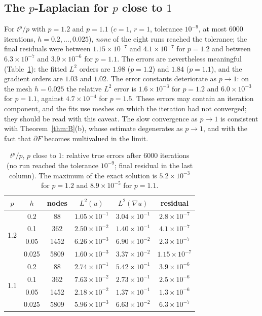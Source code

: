\documentclass[11pt]{amsart}
\theoremstyle{definition}
\theoremstyle{remark}
\numberwithin{equation}{section}
\begin{document}
\subsection{The $p$-Laplacian for $p$ close to $1$}\label{ssec:pto1}
For $t^p/p$ with $p=1.2$ and $p=1.1$ ($c=1$, $r=1$, tolerance $10^{-9}$, at most $6000$ iterations, $h=0.2,\dots,0.025$), \emph{none} of the eight runs reached the tolerance; the final residuals were between $1.15\times10^{-7}$ and $4.1\times10^{-7}$ for $p=1.2$ and between $6.3\times10^{-7}$ and $3.9\times10^{-6}$ for $p=1.1$. The errors are nevertheless meaningful (Table~\ref{tab:pto1}): the fitted $L^2$ orders are $1.98$ ($p=1.2$) and $1.84$ ($p=1.1$), and the gradient orders are $1.03$ and $1.02$. The error constants deteriorate as $p\to1$: on the mesh $h=0.025$ the relative $L^2$ error is $1.6\times10^{-3}$ for $p=1.2$ and $6.0\times10^{-3}$ for $p=1.1$, against $4.7\times10^{-4}$ for $p=1.5$. These errors may contain an iteration component, and the fits use meshes on which the iteration had not converged; they should be read with this caveat. The slow convergence as $p\to1$ is consistent with Theorem~\ref{thm:B}(b), whose estimate degenerates as $p\to1$, and with the fact that $\partial F$ becomes multivalued in the limit.

\begin{table}[t]
\caption{$t^p/p$, $p$ close to $1$: relative true errors after $6000$ iterations (no run reached the tolerance $10^{-9}$; final residual in the last column). The maximum of the exact solution is $5.2\times10^{-3}$ for $p=1.2$ and $8.9\times10^{-5}$ for $p=1.1$.}\label{tab:pto1}
\small
\begin{tabular}{@{}cccccc@{}}
\toprule
$p$ & $h$ & nodes & $L^2(u)$ & $L^2(\nabla u)$ & residual\\
\midrule
\multirow{4}{*}{1.2} & 0.2 & 88 & $1.05\times10^{-1}$ & $3.04\times10^{-1}$ & $2.8\times10^{-7}$\\
 & 0.1 & 362 & $2.50\times10^{-2}$ & $1.40\times10^{-1}$ & $4.1\times10^{-7}$\\
 & 0.05 & 1452 & $6.26\times10^{-3}$ & $6.90\times10^{-2}$ & $2.3\times10^{-7}$\\
 & 0.025 & 5809 & $1.60\times10^{-3}$ & $3.37\times10^{-2}$ & $1.15\times10^{-7}$\\
\midrule
\multirow{4}{*}{1.1} & 0.2 & 88 & $2.74\times10^{-1}$ & $5.42\times10^{-1}$ & $3.9\times10^{-6}$\\
 & 0.1 & 362 & $7.63\times10^{-2}$ & $2.73\times10^{-1}$ & $2.5\times10^{-6}$\\
 & 0.05 & 1452 & $2.18\times10^{-2}$ & $1.37\times10^{-1}$ & $1.3\times10^{-6}$\\
 & 0.025 & 5809 & $5.96\times10^{-3}$ & $6.63\times10^{-2}$ & $6.3\times10^{-7}$\\
\bottomrule
\end{tabular}
\end{table}
\end{document}

